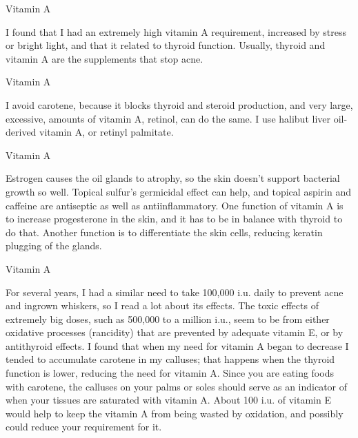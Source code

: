 \documentclass[11pt,oneside,openany,extrafontsizes]{memoir}
\begin{document}
\begin{standalonequote}{Vitamin A}

    \begin{answer}
        I found that I had an extremely high vitamin A requirement, increased by stress or bright light, and that it related to thyroid function. Usually, thyroid and vitamin A are the supplements that stop acne.
    \end{answer}
\end{standalonequote}

\begin{standalonequote}{Vitamin A}

    \begin{answer}
        I avoid carotene, because it blocks thyroid and steroid production, and very large, excessive, amounts of vitamin A, retinol, can do the same. I use halibut liver oil-derived vitamin A, or retinyl palmitate.
    \end{answer}
\end{standalonequote}

\begin{standalonequote}{Vitamin A}

    \begin{answer}
        Estrogen causes the oil glands to atrophy, so the skin doesn't support bacterial growth so well. Topical sulfur's germicidal effect can help, and topical aspirin and caffeine are antiseptic as well as antiinflammatory. One function of vitamin A is to increase progesterone in the skin, and it has to be in balance with thyroid to do that. Another function is to differentiate the skin cells, reducing keratin plugging of the glands.
    \end{answer}
\end{standalonequote}

\begin{standalonequote}{Vitamin A}

    \begin{answer}
        For several years, I had a similar need to take 100,000 i.u. daily to prevent acne and ingrown whiskers, so I read a lot about its effects. The toxic effects of extremely big doses, such as 500,000 to a million i.u., seem to be from either oxidative processes (rancidity) that are prevented by adequate vitamin E, or by antithyroid effects. I found that when my need for vitamin A began to decrease I tended to accumulate carotene in my calluses; that happens when the thyroid function is lower, reducing the need for vitamin A. Since you are eating foods with carotene, the calluses on your palms or soles should serve as an indicator of when your tissues are saturated with vitamin A. About 100 i.u. of vitamin E would help to keep the vitamin A from being wasted by oxidation, and possibly could reduce your requirement for it.
    \end{answer}
\end{standalonequote}
\end{document}
